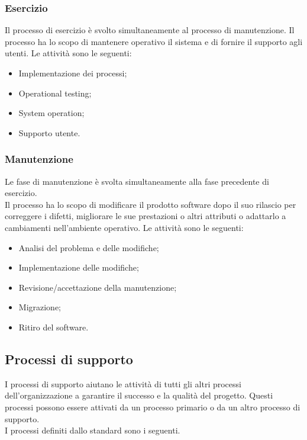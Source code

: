 \subsubsection{Esercizio}
Il processo di esercizio è svolto simultaneamente al processo di manutenzione. Il processo ha lo scopo di mantenere operativo il sistema e di fornire il supporto agli utenti. 
Le attività sono le seguenti:

\begin{itemize}

\item Implementazione dei processi;

\item Operational testing;

\item System operation;

\item Supporto utente.

\end{itemize}

\subsubsection{Manutenzione}
Le fase di manutenzione è svolta simultaneamente alla fase precedente di esercizio.\\
Il processo ha lo scopo di modificare il prodotto software dopo il suo rilascio per correggere i difetti, migliorare le sue prestazioni o altri attributi o adattarlo a cambiamenti nell'ambiente operativo.
Le attività sono le seguenti:

\begin{itemize}

\item Analisi del problema e delle modifiche;

\item Implementazione delle modifiche;

\item Revisione/accettazione della manutenzione;

\item Migrazione;

\item Ritiro del software.

\end{itemize}

\subsection{Processi di supporto}
I processi di supporto aiutano le attività di tutti gli altri processi dell'organizzazione a garantire il successo e la qualità del progetto.
Questi processi possono essere attivati da un processo primario o da un altro processo di supporto. \\
I processi definiti dallo standard sono i seguenti.

